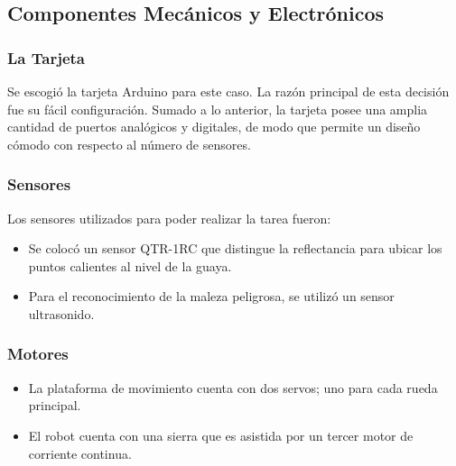 \documentclass[conference]{IEEEtran}
\begin{document}
\subsection{Componentes Mecánicos y Electrónicos}

\bigskip

\subsubsection{La Tarjeta}

Se escogió la tarjeta Arduino para este caso. La razón principal de esta decisión fue su fácil configuración. Sumado a lo anterior, la tarjeta posee una amplia cantidad de puertos analógicos y digitales, de modo que permite un diseño cómodo con respecto al número de sensores.

\bigskip
\subsubsection{Sensores}

\bigskip

Los sensores utilizados para poder realizar la tarea fueron:

\bigskip
\begin{itemize}
	
	
\item Se colocó un sensor QTR-1RC que distingue la reflectancia para ubicar los puntos calientes al nivel de la guaya. 

\item Para el reconocimiento de la maleza peligrosa, se utilizó un sensor ultrasonido.


\end{itemize}

\bigskip
\subsubsection{Motores}

\bigskip

\begin{itemize}
\bigskip

\item La plataforma de movimiento cuenta con dos servos; uno para cada rueda principal.

\item El robot cuenta con una sierra que es asistida por un tercer motor de corriente continua.

\end{itemize}
\end{document}
